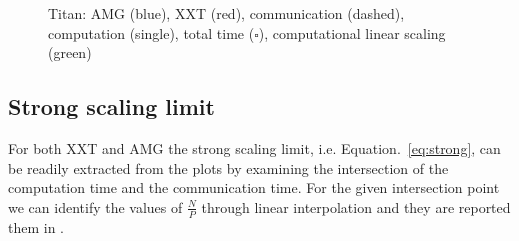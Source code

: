 \documentclass{sig-alternate}
\begin{document}
\begin{figure}
{  }
\caption{Titan: AMG ({\color{blue}blue}), XXT ({\color{red}red}), communication (dashed),
  computation (single),  total time ($\square$), computational linear scaling
  ({\color{green}green})}
\label{fig:scaling_titan}
\end{figure}




\subsection{Strong scaling limit}

For both XXT and AMG the strong scaling limit, i.e. Equation.~\ref{eq:strong}, can be readily extracted from the plots by examining the intersection of the computation time 
and the communication time. For the given intersection point we can identify the values of $\frac{N}{P}$ through linear interpolation and they are reported them in .
\end{document}
